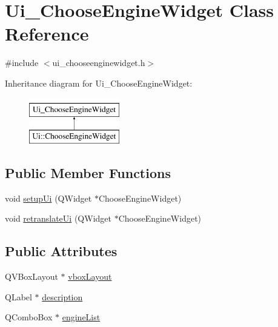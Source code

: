 \hypertarget{classUi__ChooseEngineWidget}{\section{Ui\+\_\+\+Choose\+Engine\+Widget Class Reference}
\label{classUi__ChooseEngineWidget}
}


{\ttfamily \#include $<$ui\+\_\+chooseenginewidget.\+h$>$}

Inheritance diagram for Ui\+\_\+\+Choose\+Engine\+Widget\+:\begin{figure}[H]
\begin{center}
\leavevmode
\includegraphics[height=2.000000cm]{classUi__ChooseEngineWidget}
\end{center}
\end{figure}
\subsection*{Public Member Functions}
\begin{DoxyCompactItemize}
\item 
void \hyperlink{classUi__ChooseEngineWidget_a1f7aa23b004748d7d3c5f9d159709d29}{setup\+Ui} (Q\+Widget $\ast$Choose\+Engine\+Widget)
\item 
void \hyperlink{classUi__ChooseEngineWidget_a636660d90f6dd75b0dc103df14a64322}{retranslate\+Ui} (Q\+Widget $\ast$Choose\+Engine\+Widget)
\end{DoxyCompactItemize}
\subsection*{Public Attributes}
\begin{DoxyCompactItemize}
\item 
Q\+V\+Box\+Layout $\ast$ \hyperlink{classUi__ChooseEngineWidget_abccfd24c2a3c6025b0099569dd4a4ab1}{vbox\+Layout}
\item 
Q\+Label $\ast$ \hyperlink{classUi__ChooseEngineWidget_aa5f94d071660758b15c9fafe3d143084}{description}
\item 
Q\+Combo\+Box $\ast$ \hyperlink{classUi__ChooseEngineWidget_aa7a6b768bf39b9a1f5e968edab33d00b}{engine\+List}
\end{DoxyCompactItemize}


